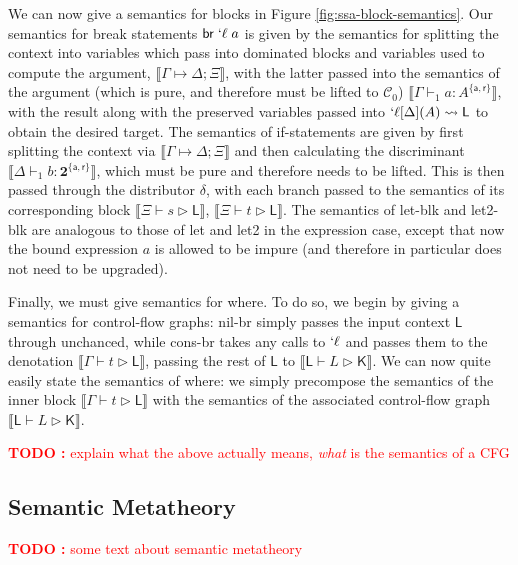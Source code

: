 \documentclass[acmsmall,screen,review]{acmart}
\newcounter{todos}
\newcommand{\TODO}[1]{{
  \stepcounter{todos}
  \begin{center}\large{\textcolor{red}{\textbf{TODO \arabic{todos}:} #1}}\end{center}
}}
\newcommand{\mc}[1]{\ensuremath{\mathcal{#1}}}
\newcommand{\mb}[1]{\ensuremath{\mathbf{#1}}}
\newcommand{\ms}[1]{\ensuremath{\mathsf{#1}}}
\newcommand{\lbl}[1]{{`#1}}
\newcommand{\brb}[2]{\ms{br}\;#1\;#2}
\newcommand{\lbrb}[2]{\brb{\lbl{#1}}{#2}}
\newcommand{\csplits}[3]{#1 \mapsto #2;#3}
\newcommand{\lwk}[2]{#1 \rightsquigarrow #2}
\newcommand{\lhyp}[3]{#1[#2](#3)}
\newcommand{\llhyp}[3]{\lhyp{\lbl{#1}}{#2}{#3}}
\newcommand{\rle}[1]{{\scriptsize\textsf{#1}}}
\newcommand{\tint}{{\{\ms{a}, \ms{r}\}}}
\newcommand{\hasty}[5]{#1 \vdash_{#2} #3: {#4}^{#5}}
\newcommand{\haslb}[3]{#1 \vdash #2 \rhd #3}
\newcommand{\lhaslb}[3]{#1 \vdash #2 \rhd #3}
\newcommand{\dnt}[1]{\llbracket{#1}\rrbracket}
\begin{document}
We can now give a semantics for blocks in Figure \ref{fig:ssa-block-semantics}.
Our semantics for break statements \(\lbrb{\ell}{a}\) is given by the semantics
for splitting the context into variables which pass into dominated blocks and
variables used to compute the argument, \(\dnt{\csplits{\Gamma}{\Delta}{\Xi}}\),
with the latter passed into the semantics of the argument (which is pure, and
therefore must be lifted to \(\mc{C}_0\))
\(\dnt{\hasty{\Gamma}{1}{a}{A}{\tint}}\), with the result along with the
preserved variables passed into \(\lwk{\llhyp{\ell}{\Delta}{A}}{\ms{L}}\) to
obtain the desired target. The semantics of if-statements are given by first
splitting the context via \(\dnt{\csplits{\Gamma}{\Delta}{\Xi}}\) and then
calculating the discriminant \(\dnt{\hasty{\Delta}{1}{b}{\mb{2}}{\tint}}\),
which must be pure and therefore needs to be lifted. This is then passed through
the distributor \(\delta\), with each branch passed to the semantics of its
corresponding block \(\dnt{\haslb{\Xi}{s}{\ms{L}}}\),
\(\dnt{\haslb{\Xi}{t}{\ms{L}}}\). The semantics of \rle{let-blk} and
\rle{let2-blk} are analogous to those of \rle{let} and \rle{let2} in the
expression case, except that now the bound expression \(a\) is allowed to be
impure (and therefore in particular does not need to be upgraded).

Finally, we must give semantics for \rle{where}. To do so, we begin by giving a
semantics for control-flow graphs: \rle{nil-br} simply passes the input context
\(\ms{L}\) through unchanced, while \rle{cons-br} takes any calls to
\(\lbl{\ell}\) and passes them to the denotation
\(\dnt{\haslb{\Gamma}{t}{\ms{L}}}\), passing the rest of \(\ms{L}\) to
\(\dnt{\lhaslb{\ms{L}}{L}{\ms{K}}}\). We can now quite easily state the
semantics of \rle{where}: we simply precompose the semantics of the inner block
\(\dnt{\haslb{\Gamma}{t}{\ms{L}}}\) with the semantics of the associated
control-flow graph \(\dnt{\lhaslb{\ms{L}}{L}{\ms{K}}}\).

\TODO{explain what the above actually means, \textit{what} is the semantics of a
CFG}


\subsection{Semantic Metatheory}

\TODO{some text about semantic metatheory}
\end{document}
